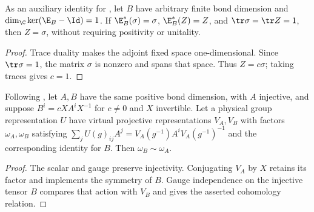 \begin{lemma}
    \label{thm:spc_aux_normalized_stationary_unique}
    \leanok
    As an auxiliary identity for
    \cite[Appendix~C, lines~2653--2717]{Schuch2011Phases}, let $B$ have
    arbitrary finite bond dimension and $\dim_{\C}\ker(\E_B-\Id)=1$.
    If $\E_B^*(\sigma)=\sigma$, $\E_B^*(Z)=Z$, and
    $\tr\sigma=\tr Z=1$, then $Z=\sigma$, without requiring positivity or
    unitality.
\end{lemma}
\begin{proof}\leanok
    Trace duality makes the adjoint fixed space one-dimensional.
    Since $\tr\sigma=1$, the matrix $\sigma$ is nonzero and spans that space.
    Thus $Z=c\sigma$; taking traces gives $c=1$.
\end{proof}

\begin{lemma}
    \label{thm:spc_aux_injective_gauge_class}
    \leanok
    Following \cite[Section~II.F.2 and Appendix~C]{Schuch2011Phases}, let
    $A,B$ have the same positive bond dimension, with $A$ injective,
    and suppose $B^i=cXA^iX^{-1}$ for $c\ne0$ and $X$ invertible.
    Let a physical group representation $U$ have virtual projective
    representations $V_A,V_B$ with factors $\omega_A,\omega_B$ satisfying
    $\sum_jU(g)_{ij}A^j=V_A(g^{-1})A^iV_A(g^{-1})^{-1}$ and the
    corresponding identity for $B$. Then $\omega_B\sim\omega_A$.
\end{lemma}
\begin{proof}\leanok
    The scalar and gauge preserve injectivity. Conjugating $V_A$ by $X$
    retains its factor and implements the symmetry of $B$.
    Gauge independence on the injective tensor $B$ compares that action with
    $V_B$ and gives the asserted cohomology relation.
\end{proof}

